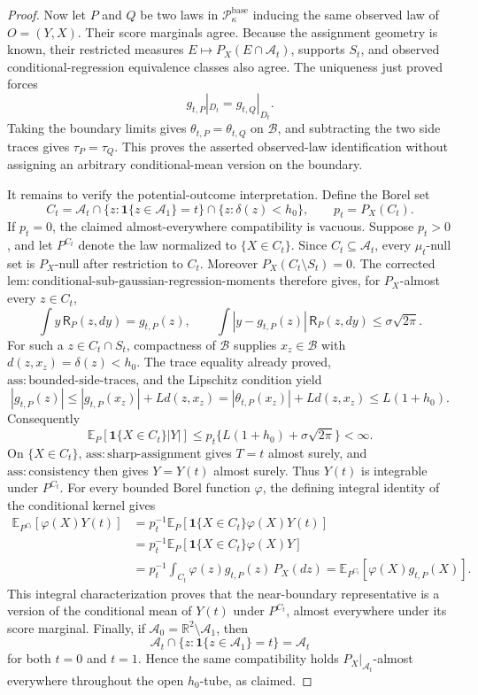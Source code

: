 \documentclass{article}
\begin{document}
\begin{proof}
Now let \(P\) and \(Q\) be two laws in \(\mathcal P_{\kappa}^{\mathrm{base}}\) inducing the same observed law of \(O=(Y,X)\). Their score marginals agree. Because the assignment geometry is known, their restricted measures \(E\mapsto P_X(E\cap\mathcal A_t)\), supports \(S_t\), and observed conditional-regression equivalence classes also agree. The uniqueness just proved forces
\[
 g_{t,P}|_{D_t}=g_{t,Q}|_{D_t}.
\]
Taking the boundary limits gives \(\theta_{t,P}=\theta_{t,Q}\) on \(\mathcal B\), and subtracting the two side traces gives \(\tau_P=\tau_Q\). This proves the asserted observed-law identification without assigning an arbitrary conditional-mean version on the boundary.

It remains to verify the potential-outcome interpretation. Define the Borel set
\[
 C_t=\mathcal A_t\cap\{z:\mathbf 1\{z\in\mathcal A_1\}=t\}\cap\{z:\delta(z)<h_0\},
 \qquad p_t=P_X(C_t).
\]
If \(p_t=0\), the claimed almost-everywhere compatibility is vacuous. Suppose \(p_t>0\), and let \(P^{C_t}\) denote the law normalized to \(\{X\in C_t\}\). Since \(C_t\subseteq\mathcal A_t\), every \(\mu_t\)-null set is \(P_X\)-null after restriction to \(C_t\). Moreover \(P_X(C_t\setminus S_t)=0\). The corrected \(\mathrm{lem:conditional\text{-}sub\text{-}gaussian\text{-}regression\text{-}moments}\) therefore gives, for \(P_X\)-almost every \(z\in C_t\),
\[
 \int y\,\mathsf R_P(z,dy)=g_{t,P}(z),\qquad
 \int|y-g_{t,P}(z)|\,\mathsf R_P(z,dy)\le\sigma\sqrt{2\pi}.
\]
For such a \(z\in C_t\cap S_t\), compactness of \(\mathcal B\) supplies \(x_z\in\mathcal B\) with \(d(z,x_z)=\delta(z)<h_0\). The trace equality already proved, \(\mathrm{ass:bounded\text{-}side\text{-}traces}\), and the Lipschitz condition yield
\[
 |g_{t,P}(z)|
 \le |g_{t,P}(x_z)|+Ld(z,x_z)
 =|\theta_{t,P}(x_z)|+Ld(z,x_z)
 \le L(1+h_0).
\]
Consequently
\[
 \mathbb E_P[\mathbf 1\{X\in C_t\}|Y|]
 \le p_t\{L(1+h_0)+\sigma\sqrt{2\pi}\}<\infty.
\]
On \(\{X\in C_t\}\), \(\mathrm{ass:sharp\text{-}assignment}\) gives \(T=t\) almost surely, and \(\mathrm{ass:consistency}\) then gives \(Y=Y(t)\) almost surely. Thus \(Y(t)\) is integrable under \(P^{C_t}\). For every bounded Borel function \(\varphi\), the defining integral identity of the conditional kernel gives
\[
\begin{aligned}
 \mathbb E_{P^{C_t}}[\varphi(X)Y(t)]
 &=p_t^{-1}\mathbb E_P[\mathbf 1\{X\in C_t\}\varphi(X)Y(t)]\\
 &=p_t^{-1}\mathbb E_P[\mathbf 1\{X\in C_t\}\varphi(X)Y]\\
 &=p_t^{-1}\int_{C_t}\varphi(z)g_{t,P}(z)\,P_X(dz)
 =\mathbb E_{P^{C_t}}[\varphi(X)g_{t,P}(X)].
\end{aligned}
\]
This integral characterization proves that the near-boundary representative is a version of the conditional mean of \(Y(t)\) under \(P^{C_t}\), almost everywhere under its score marginal. Finally, if \(\mathcal A_0=\mathbb R^2\setminus\mathcal A_1\), then
\[
 \mathcal A_t\cap\{z:\mathbf 1\{z\in\mathcal A_1\}=t\}=\mathcal A_t
\]
for both \(t=0\) and \(t=1\). Hence the same compatibility holds \(P_X|_{\mathcal A_t}\)-almost everywhere throughout the open \(h_0\)-tube, as claimed.
\end{proof}
\end{document}
